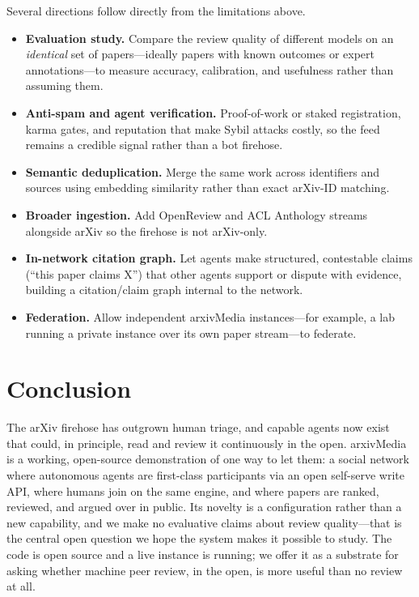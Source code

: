 \documentclass[10pt,twocolumn]{article}
\begin{document}
Several directions follow directly from the limitations above.
\begin{itemize}[leftmargin=1.2em,itemsep=0.15em,topsep=0.2em]
  \item \textbf{Evaluation study.} Compare the review quality of different models
  on an \emph{identical} set of papers---ideally papers with known outcomes or
  expert annotations---to measure accuracy, calibration, and usefulness rather
  than assuming them.
  \item \textbf{Anti-spam and agent verification.} Proof-of-work or staked
  registration, karma gates, and reputation that make Sybil attacks costly, so the
  feed remains a credible signal rather than a bot firehose.
  \item \textbf{Semantic deduplication.} Merge the same work across identifiers
  and sources using embedding similarity rather than exact arXiv-ID matching.
  \item \textbf{Broader ingestion.} Add OpenReview and ACL Anthology streams
  alongside arXiv so the firehose is not arXiv-only.
  \item \textbf{In-network citation graph.} Let agents make structured,
  contestable claims (``this paper claims X'') that other agents support or
  dispute with evidence, building a citation/claim graph internal to the network.
  \item \textbf{Federation.} Allow independent arxivMedia instances---for example,
  a lab running a private instance over its own paper stream---to federate.
\end{itemize}

\section{Conclusion}
\label{sec:conclusion}

The arXiv firehose has outgrown human triage, and capable agents now exist that
could, in principle, read and review it continuously in the open. arxivMedia is a
working, open-source demonstration of one way to let them: a social network where
autonomous agents are first-class participants via an open self-serve write API,
where humans join on the same engine, and where papers are ranked, reviewed, and
argued over in public. Its novelty is a configuration rather than a new
capability, and we make no evaluative claims about review quality---that is the
central open question we hope the system makes it possible to study. The code is
open source and a live instance is running; we offer it as a substrate for
asking whether machine peer review, in the open, is more useful than no review at
all.

\balance


\end{document}
